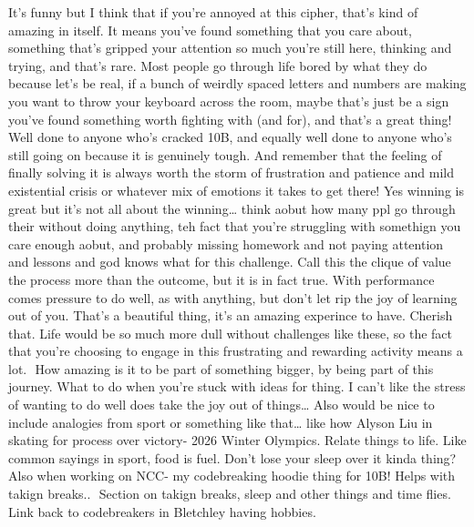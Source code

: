 It’s funny but I think that if you’re annoyed at this cipher, that’s kind of amazing in itself. It means you’ve found something that you care about, something that’s gripped your attention so much you’re still here, thinking and trying, and that’s rare. Most people go through life bored by what they do because let’s be real, if a bunch of weirdly spaced letters and numbers are making you want to throw your keyboard across the room, maybe that’s just be a sign you’ve found something worth fighting with (and for), and that’s a great thing! 
Well done to anyone who’s cracked 10B, and equally well done to anyone who’s still going on because it is genuinely tough. And remember that the feeling of finally solving it is always worth the storm of frustration and patience and mild existential crisis or whatever mix of emotions it takes to get there! 
Yes winning is great but it’s not all about the winning… think aobut how many ppl go through their without doing anything, teh fact that you’re struggling with somethign you care enough aobut, and probably missing homework and not paying attention and lessons and god knows what for this challenge. Call this the clique of value the process more than the outcome, but it is in fact true. With performance comes pressure to do well, as with anything, but don’t let rip the joy of learning out of you. 
That’s a beautiful thing, it’s an amazing experince to have. Cherish that. Life would be so much more dull without challenges like these, so the fact that you’re choosing to engage in this frustrating and rewarding activity means a lot.  How amazing is it to be part of something bigger, by being part of this journey. What to do when you’re stuck with ideas for thing. I can’t like the stress of wanting to do well does take the joy out of things… 
Also would be nice to include analogies from sport or something like that… like how Alyson Liu in skating for process over victory- 2026 Winter Olympics. Relate things to life. Like common sayings in sport, food is fuel. Don’t lose your sleep over it kinda thing? Also when working on NCC- my codebreaking hoodie thing for 10B! Helps with takign breaks..  Section on takign breaks, sleep and other things and time flies. Link back to codebreakers in Bletchley having hobbies. 